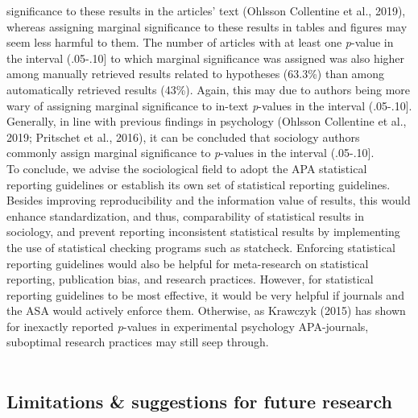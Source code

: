 \documentclass[
  12pt,
]{article}
\begin{document}
significance to these results in the articles' text (Ohlsson Collentine
et al., 2019), whereas assigning marginal significance to these results
in tables and figures may seem less harmful to them. The number of
articles with at least one \emph{p}-value in the interval (.05-.10{]} to
which marginal significance was assigned was also higher among manually
retrieved results related to hypotheses (63.3\%) than among
automatically retrieved results (43\%). Again, this may due to authors
being more wary of assigning marginal significance to in-text
\emph{p}-values in the interval (.05-.10{]}. Generally, in line with
previous findings in psychology (Ohlsson Collentine et al., 2019;
Pritschet et al., 2016), it can be concluded that sociology authors
commonly assign marginal significance to \emph{p}-values in the interval
(.05-.10{]}. ~\\
\hspace*{0.333em}\hspace*{0.333em}\hspace*{0.333em}\hspace*{0.333em}To
conclude, we advise the sociological field to adopt the APA statistical
reporting guidelines or establish its own set of statistical reporting
guidelines. Besides improving reproducibility and the information value
of results, this would enhance standardization, and thus, comparability
of statistical results in sociology, and prevent reporting inconsistent
statistical results by implementing the use of statistical checking
programs such as statcheck. Enforcing statistical reporting guidelines
would also be helpful for meta-research on statistical reporting,
publication bias, and research practices. However, for statistical
reporting guidelines to be most effective, it would be very helpful if
journals and the ASA would actively enforce them. Otherwise, as Krawczyk
(2015) has shown for inexactly reported \emph{p}-values in experimental
psychology APA-journals, suboptimal research practices may still seep
through.\\
~\\

\hypertarget{limitations-suggestions-for-future-research}{%
\subsection{Limitations \& suggestions for future
research}\label{limitations-suggestions-for-future-research}}
\end{document}

